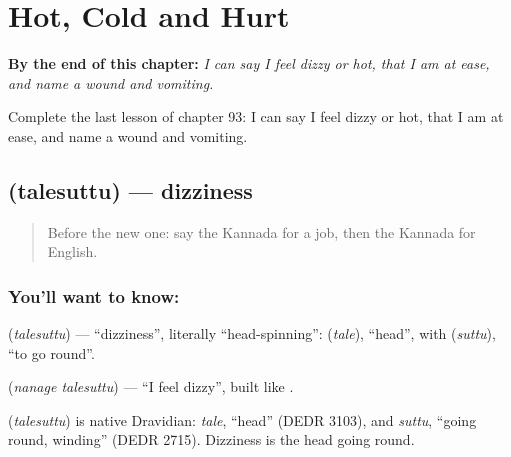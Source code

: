 
\chapter{Hot, Cold and Hurt}
\label{ch:ka-hot-cold-and-hurt}

\begin{chapteropening}
\textbf{By the end of this chapter:} \emph{I can say I feel dizzy or hot, that I am at ease, and name a wound and vomiting.}

Complete the last lesson of chapter 93: I can say I feel dizzy or hot, that I am at ease, and name a wound and vomiting.
\end{chapteropening}

\section[\texorpdfstring{\kn{ತಲೆಸುತ್ತು} (talesuttu)}{ತಲೆಸುತ್ತು (talesuttu)}]{ (talesuttu) — dizziness}

\label{lesson:KA-C93-dizzy}



\begin{quote}
Before the new one: say the Kannada for a job, then the Kannada for English.
\end{quote}

\subsection*{You'll want to know: }
\textbf{} (\emph{talesuttu}) — \textquotedblleft{}dizziness\textquotedblright{}, literally \textquotedblleft{}head-spinning\textquotedblright{}: \textbf{} (\emph{tale}), \textquotedblleft{}head\textquotedblright{}, with \textbf{} (\emph{suttu}), \textquotedblleft{}to go round\textquotedblright{}.

\textbf{ } (\emph{nanage talesuttu}) — \textquotedblleft{}I feel dizzy\textquotedblright{}, built like \textbf{ }.

\begin{cousinweb}
\textbf{} (\emph{talesuttu}) is native Dravidian: \emph{tale}, \textquotedblleft{}head\textquotedblright{} (DEDR 3103), and \emph{suttu}, \textquotedblleft{}going round, winding\textquotedblright{} (DEDR 2715). Dizziness is the head going round.
\end{cousinweb}

